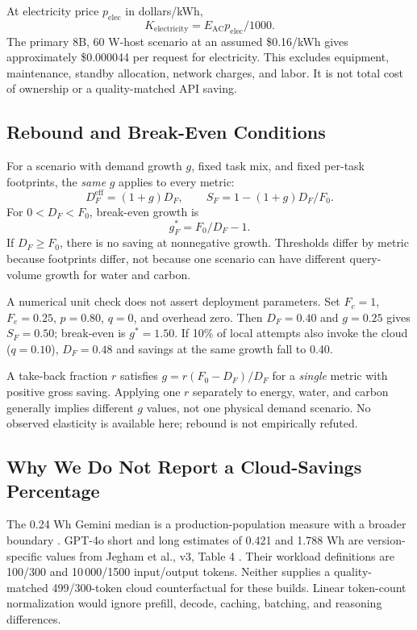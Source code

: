 \documentclass[conference]{IEEEtran}
\begin{document}
At electricity price $p_{\mathrm{elec}}$ in dollars/kWh,
\begin{equation}
K_{\mathrm{electricity}}=E_{\mathrm{AC}}p_{\mathrm{elec}}/1000.
\end{equation}
The primary 8B, 60 W-host scenario at an assumed \$0.16/kWh gives
approximately \$0.000044 per request for electricity. This excludes
equipment, maintenance, standby allocation, network charges, and labor.
It is not total cost of ownership or a quality-matched API saving.

\subsection{Rebound and Break-Even Conditions}
For a scenario with demand growth $g$, fixed task mix, and fixed
per-task footprints, the \emph{same} $g$ applies to every metric:
\begin{equation}
D_F^{\mathrm{eff}}=(1+g)D_F,\qquad
S_F=1-(1+g)D_F/F_0. \label{eq:rebound}
\end{equation}
For $0<D_F<F_0$, break-even growth is
\begin{equation}
g_F^*=F_0/D_F-1. \label{eq:gstar}
\end{equation}
If $D_F\ge F_0$, there is no saving at nonnegative growth.
Thresholds differ by metric because footprints differ, not because one
scenario can have different query-volume growth for water and carbon.

A numerical unit check does not assert deployment parameters.
Set $F_c=1$, $F_e=0.25$, $p=0.80$, $q=0$, and overhead zero.
Then $D_F=0.40$ and $g=0.25$ gives $S_F=0.50$; break-even is
$g^*=1.50$. If 10\% of local attempts also invoke the cloud
($q=0.10$), $D_F=0.48$ and savings at the same growth fall to 0.40.

A take-back fraction $r$ satisfies
$g=r(F_0-D_F)/D_F$ for a \emph{single} metric with positive gross saving.
Applying one $r$ separately to energy, water, and carbon generally implies
different $g$ values, not one physical demand scenario. No observed
elasticity is available here; rebound is not empirically refuted.

\subsection{Why We Do Not Report a Cloud-Savings Percentage}
The 0.24 Wh Gemini median is a production-population measure with a
broader boundary \cite{elsworth2025}.
GPT-4o short and long estimates of 0.421 and 1.788 Wh are version-specific
values from Jegham et al., v3, Table 4 \cite{jegham2025}.
Their workload definitions are 100/300 and 10\,000/1500 input/output
tokens. Neither supplies a quality-matched 499/300-token cloud
counterfactual for these builds. Linear token-count normalization would
ignore prefill, decode, caching, batching, and reasoning differences.
\end{document}
